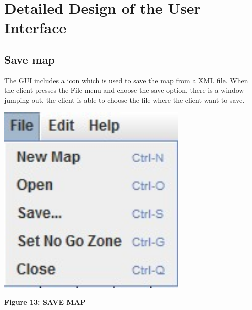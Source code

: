 \documentclass[11pt, a4paper]{report}
\begin{document}
\section{Detailed Design of the User Interface}
\subsection{Save map}
The GUI includes a icon which is used to save the map from a XML file. When the client presses the File menu and choose the save option, there is a window jumping out, the client is able to choose the file where the client want to save.
\begin{center}
 \includegraphics[width=9.20cm]{save}
\end{center}
\begin{center}
\textbf {Figure 13: SAVE MAP} \\[0.3cm]
\end{center}
\end{document}
